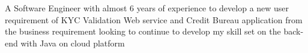 


\begin{cvparagraph}


    A Software Engineer with almost 6 years of experience to develop a new user requirement of KYC Validation Web service and Credit Bureau application from the business requirement looking to continue to develop my skill set on the back-end with Java on cloud platform

\end{cvparagraph}
